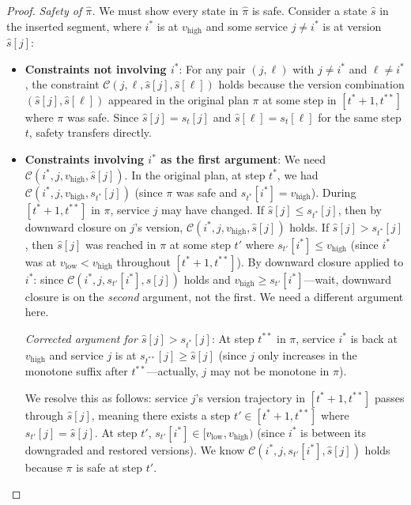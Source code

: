 \documentclass[10pt,twocolumn]{article}
\begin{document}
\begin{proof}
\emph{Safety of $\hat{\pi}$.} We must show every state in $\hat{\pi}$ is safe. Consider a state $\hat{s}$ in the inserted segment, where $i^*$ is at $v_{\mathrm{high}}$ and some service $j \neq i^*$ is at version $\hat{s}[j]$:

\begin{itemize}
\item \textbf{Constraints not involving $i^*$}: For any pair $(j,\ell)$ with $j \neq i^*$ and $\ell \neq i^*$, the constraint $\mathcal{C}(j,\ell,\hat{s}[j],\hat{s}[\ell])$ holds because the version combination $(\hat{s}[j], \hat{s}[\ell])$ appeared in the original plan $\pi$ at some step in $[t^*+1, t^{**}]$ where $\pi$ was safe. Since $\hat{s}[j] = s_t[j]$ and $\hat{s}[\ell] = s_t[\ell]$ for the same step $t$, safety transfers directly.

\item \textbf{Constraints involving $i^*$ as the first argument}: We need $\mathcal{C}(i^*,j,v_{\mathrm{high}},\hat{s}[j])$. In the original plan, at step $t^*$, we had $\mathcal{C}(i^*,j,v_{\mathrm{high}},s_{t^*}[j])$ (since $\pi$ was safe and $s_{t^*}[i^*] = v_{\mathrm{high}}$). During $[t^*+1, t^{**}]$ in $\pi$, service $j$ may have changed. If $\hat{s}[j] \leq s_{t^*}[j]$, then by downward closure on $j$'s version, $\mathcal{C}(i^*,j,v_{\mathrm{high}},\hat{s}[j])$ holds. If $\hat{s}[j] > s_{t^*}[j]$, then $\hat{s}[j]$ was reached in $\pi$ at some step $t'$ where $s_{t'}[i^*] \leq v_{\mathrm{high}}$ (since $i^*$ was at $v_{\mathrm{low}} < v_{\mathrm{high}}$ throughout $[t^*+1, t^{**}]$). By downward closure applied to $i^*$: since $\mathcal{C}(i^*,j,s_{t'}[i^*],\hat{s}[j])$ holds and $v_{\mathrm{high}} \geq s_{t'}[i^*]$---wait, downward closure is on the \emph{second} argument, not the first. We need a different argument here.

\emph{Corrected argument for $\hat{s}[j] > s_{t^*}[j]$}: At step $t^{**}$ in $\pi$, service $i^*$ is back at $v_{\mathrm{high}}$ and service $j$ is at $s_{t^{**}}[j] \geq \hat{s}[j]$ (since $j$ only increases in the monotone suffix after $t^{**}$---actually, $j$ may not be monotone in $\pi$). 

We resolve this as follows: service $j$'s version trajectory in $[t^*+1, t^{**}]$ passes through $\hat{s}[j]$, meaning there exists a step $t' \in [t^*+1, t^{**}]$ where $s_{t'}[j] = \hat{s}[j]$. At step $t'$, $s_{t'}[i^*] \in [v_{\mathrm{low}}, v_{\mathrm{high}})$ (since $i^*$ is between its downgraded and restored versions). We know $\mathcal{C}(i^*,j,s_{t'}[i^*],\hat{s}[j])$ holds because $\pi$ is safe at step $t'$. 


\end{itemize}
\end{proof}
\end{document}
